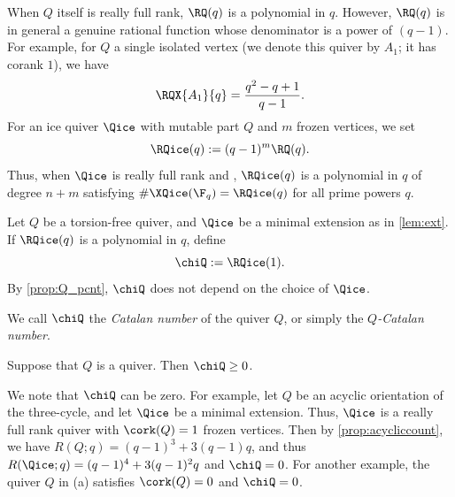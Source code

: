 When $Q$ itself is really full rank, $\RQ(q)$ is a polynomial in $q$. However, $\RQ(q)$ is in general a genuine rational function whose denominator is a power of $(q-1)$. For example, for $Q$ a single isolated vertex (we denote this quiver by $A_1$; it has corank $1$), we have
\begin{equation}\label{eq:A1}
  \RQX{A_1}{q}=\frac{q^2-q+1}{q-1}.
\end{equation}
For an ice quiver $\Qice$ with mutable part $Q$ and $m$ frozen vertices, we set
\begin{equation*}%
  \RQice(q):=(q-1)^m\RQ(q).
\end{equation*}
Thus, when $\Qice$ is really full rank and \Louise, $\RQice(q)$ is a polynomial in $q$ of degree $n+m$ satisfying $\#\XQice(\F_q)=\RQice(q)$ for all prime powers $q$.
\begin{definition}\label{def:QCat}
Let $Q$ be a torsion-free quiver, and $\Qice$ be a minimal extension as in \cref{lem:ext}.  If $\RQice(q)$ is a polynomial in $q$, define %
  \begin{equation*}%
    \chiQ:=\RQice(1).
  \end{equation*}
  By \cref{prop:Q_pcnt}, $\chiQ$ does not depend on the choice of $\Qice$.
\end{definition}
We call $\chiQ$ the \emph{Catalan number} of the quiver $Q$, or simply the \emph{$Q$-Catalan number}.

\begin{conjecture}\label{conj:Catalan}
Suppose that $Q$ is a \Louise quiver. %
Then $\chiQ \geq0$. %
\end{conjecture}
%

We note that $\chiQ$ can be zero.  For example, let $Q$ be an acyclic orientation of the three-cycle, and let $\Qice$ be a minimal extension. Thus, $\Qice$ is a really full rank quiver with $\cork(Q)=1$ frozen vertices.
%
 Then by \cref{prop:acycliccount}, we have $R(Q;q)=(q-1)^3+3(q-1)q$, and thus $R(\Qice;q) = (q-1)^4+3(q-1)^2q$ and  $\chiQ =0$.  For another example, the quiver $Q$ in (a) satisfies $\cork(Q) = 0$ and $\chiQ = 0$.  %

